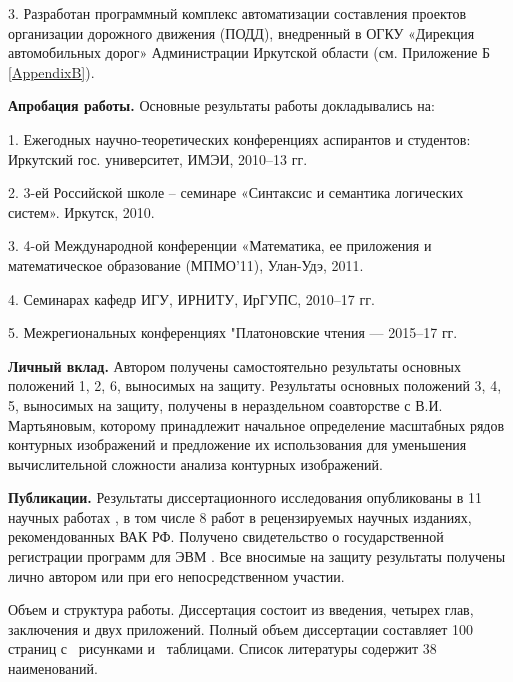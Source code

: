 3. Разработан  программный комплекс автоматизации составления проектов организации дорожного движения (ПОДД), внедренный в ОГКУ «Дирекция автомобильных дорог» Администрации Иркутской области (см. Приложение Б \ref{AppendixB}).

\textbf{Апробация работы.} Основные результаты работы докладывались на: 


1. Ежегодных научно-теоретических конференциях аспирантов и студентов:  Иркутский  гос. университет, ИМЭИ, 2010--13 гг.

2. 3-ей Российской школе – семинаре «Синтаксис и семантика логических систем». Иркутск, 2010.

3. 4-ой Международной конференции «Математика, ее приложения и математическое образование (МПМО’11),  Улан-Удэ, 2011.

4. Семинарах кафедр ИГУ, ИРНИТУ, ИрГУПС, 2010--17 гг.

5. Межрегиональных конференциях "Платоновские чтения --- 2015--17 гг.


\textbf{Личный вклад.} Автором получены самостоятельно результаты основных положений 1, 2, 6,  выносимых  на защиту.  Результаты основных положений 3, 4, 5,  выносимых  на защиту, получены в нераздельном соавторстве с В.И. Мартьяновым, которому принадлежит начальное определение масштабных рядов контурных изображений и предложение их использования для уменьшения вычислительной сложности анализа контурных изображений.


\textbf{Публикации.} Результаты диссертационного исследования
опубликованы в 11 научных работах \cite{D5,D6,D7,D8,D15,D16,D19,D20,scaleline,overlaps,emulsion}, в том числе 8 \cite{D6,D7,D8,D15,D19,D20,scaleline,overlaps,emulsion} работ в рецензируемых научных изданиях, рекомендованных ВАК РФ. Получено свидетельство о государственной регистрации программ для ЭВМ \cite{D18}.
Все вносимые на защиту результаты получены лично автором или при его непосредственном участии.


Объем и структура работы. Диссертация состоит из введения, четырех глав, заключения и двух приложений. Полный объем диссертации составляет 100 страниц с \totalfigures\ рисунками и \totaltables\ таблицами. Список литературы содержит 38 наименований.